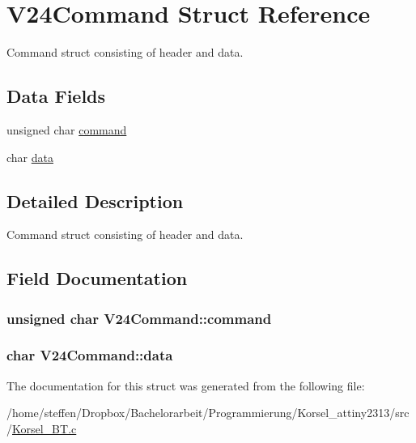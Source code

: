 \hypertarget{structV24Command}{
\section{V24Command Struct Reference}
\label{structV24Command}
}


Command struct consisting of header and data.  


\subsection*{Data Fields}
\begin{DoxyCompactItemize}
\item 
unsigned char \hyperlink{structV24Command_a9f2bd514e5b1d271779937814879d4b4}{command}
\item 
char \hyperlink{structV24Command_a7cc9a279547443aea099e2179c99078b}{data}
\end{DoxyCompactItemize}


\subsection{Detailed Description}
Command struct consisting of header and data. 

\subsection{Field Documentation}
\hypertarget{structV24Command_a9f2bd514e5b1d271779937814879d4b4}{
\subsubsection[{command}]{\setlength{\rightskip}{0pt plus 5cm}unsigned char {\bf V24Command::command}}}
\label{structV24Command_a9f2bd514e5b1d271779937814879d4b4}
\hypertarget{structV24Command_a7cc9a279547443aea099e2179c99078b}{
\subsubsection[{data}]{\setlength{\rightskip}{0pt plus 5cm}char {\bf V24Command::data}}}
\label{structV24Command_a7cc9a279547443aea099e2179c99078b}


The documentation for this struct was generated from the following file:\begin{DoxyCompactItemize}
\item 
/home/steffen/Dropbox/Bachelorarbeit/Programmierung/Korsel\_\-attiny2313/src/\hyperlink{Korsel__BT_8c}{Korsel\_\-BT.c}\end{DoxyCompactItemize}
